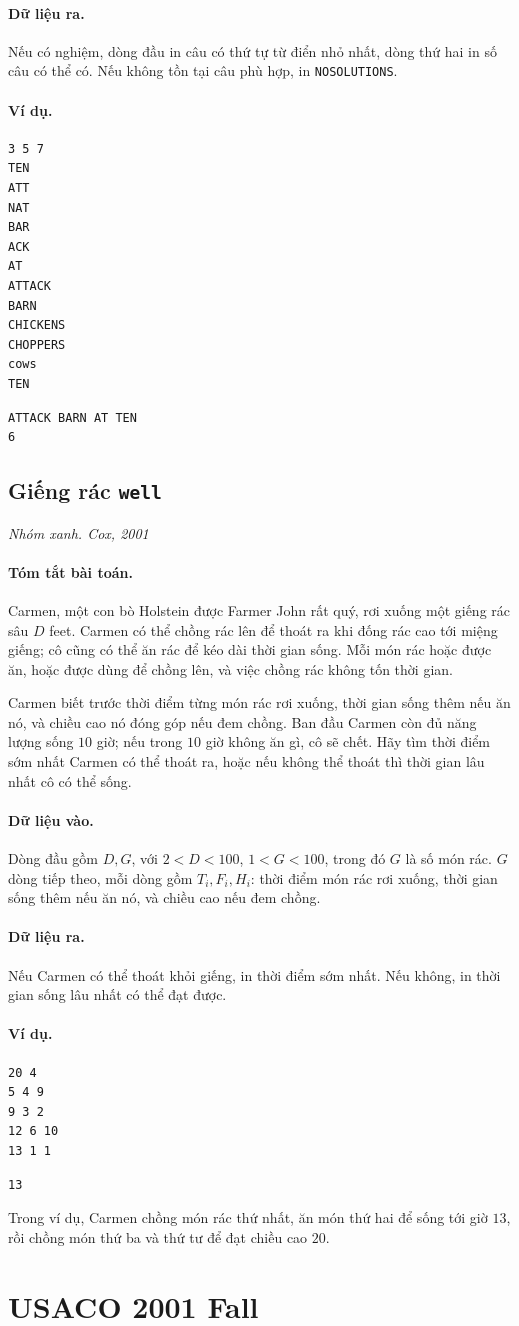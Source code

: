 \documentclass[11pt]{article}
\newcommand{\problem}[4]{%
  \subsection[#1 (#2)]{#1 \hfill {\normalsize\texttt{#2}}}%
  \noindent\textit{#3. #4}\par\smallskip
}
\newcommand{\iosec}[1]{\paragraph{#1}}
\begin{document}
\iosec{Dữ liệu ra.}
Nếu có nghiệm, dòng đầu in câu có thứ tự từ điển nhỏ nhất, dòng thứ hai in số
câu có thể có. Nếu không tồn tại câu phù hợp, in \texttt{NOSOLUTIONS}.

\iosec{Ví dụ.}
\begin{verbatim}
3 5 7
TEN
ATT
NAT
BAR
ACK
AT
ATTACK
BARN
CHICKENS
CHOPPERS
cows
TEN
\end{verbatim}

\begin{verbatim}
ATTACK BARN AT TEN
6
\end{verbatim}

\problem{Giếng rác}{well}{Nhóm xanh}{Cox, 2001}

\iosec{Tóm tắt bài toán.}
Carmen, một con bò Holstein được Farmer John rất quý, rơi xuống một giếng rác
sâu \(D\) feet. Carmen có thể chồng rác lên để thoát ra khi đống rác cao tới
miệng giếng; cô cũng có thể ăn rác để kéo dài thời gian sống. Mỗi món rác hoặc
được ăn, hoặc được dùng để chồng lên, và việc chồng rác không tốn thời gian.

Carmen biết trước thời điểm từng món rác rơi xuống, thời gian sống thêm nếu ăn
nó, và chiều cao nó đóng góp nếu đem chồng. Ban đầu Carmen còn đủ năng lượng
sống \(10\) giờ; nếu trong \(10\) giờ không ăn gì, cô sẽ chết. Hãy tìm thời
điểm sớm nhất Carmen có thể thoát ra, hoặc nếu không thể thoát thì thời gian
lâu nhất cô có thể sống.

\iosec{Dữ liệu vào.}
Dòng đầu gồm \(D,G\), với \(2<D<100\), \(1<G<100\), trong đó \(G\) là số món
rác. \(G\) dòng tiếp theo, mỗi dòng gồm \(T_i,F_i,H_i\): thời điểm món rác rơi
xuống, thời gian sống thêm nếu ăn nó, và chiều cao nếu đem chồng.

\iosec{Dữ liệu ra.}
Nếu Carmen có thể thoát khỏi giếng, in thời điểm sớm nhất. Nếu không, in thời
gian sống lâu nhất có thể đạt được.

\iosec{Ví dụ.}
\begin{verbatim}
20 4
5 4 9
9 3 2
12 6 10
13 1 1
\end{verbatim}

\begin{verbatim}
13
\end{verbatim}

Trong ví dụ, Carmen chồng món rác thứ nhất, ăn món thứ hai để sống tới giờ
\(13\), rồi chồng món thứ ba và thứ tư để đạt chiều cao \(20\).

\section{USACO 2001 Fall}
\end{document}
